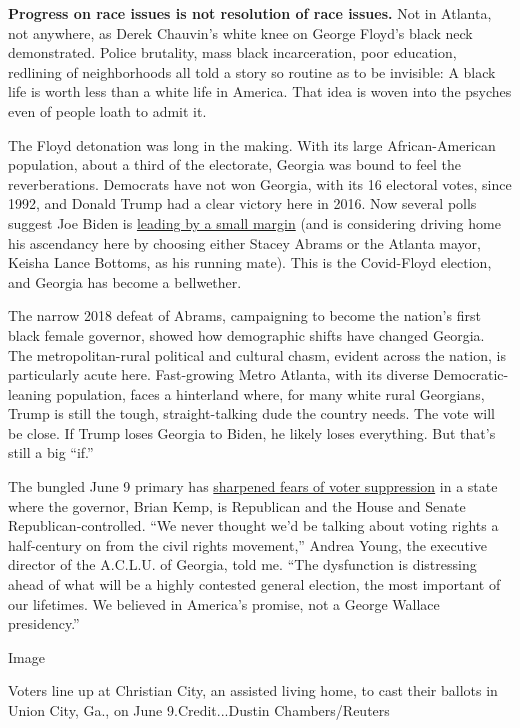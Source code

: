 \textbf{Progress on race issues is not resolution of race issues.} Not
in Atlanta, not anywhere, as Derek Chauvin's white knee on George
Floyd's black neck demonstrated. Police brutality, mass black
incarceration, poor education, redlining of neighborhoods all told a
story so routine as to be invisible: A black life is worth less than a
white life in America. That idea is woven into the psyches even of
people loath to admit it.

The Floyd detonation was long in the making. With its large
African-American population, about a third of the electorate, Georgia
was bound to feel the reverberations. Democrats have not won Georgia,
with its 16 electoral votes, since 1992, and Donald Trump had a clear
victory here in 2016. Now several polls suggest Joe Biden is
\href{https://projects.fivethirtyeight.com/polls/president-general/georgia/}{leading
by a small margin} (and is considering driving home his ascendancy here
by choosing either Stacey Abrams or the Atlanta mayor, Keisha Lance
Bottoms, as his running mate). This is the Covid-Floyd election, and
Georgia has become a bellwether.

The narrow 2018 defeat of Abrams, campaigning to become the nation's
first black female governor, showed how demographic shifts have changed
Georgia. The metropolitan-rural political and cultural chasm, evident
across the nation, is particularly acute here. Fast-growing Metro
Atlanta, with its diverse Democratic-leaning population, faces a
hinterland where, for many white rural Georgians, Trump is still the
tough, straight-talking dude the country needs. The vote will be close.
If Trump loses Georgia to Biden, he likely loses everything. But that's
still a big ``if.''

The bungled June 9 primary has
\href{https://www.nytimes3xbfgragh.onion/2020/06/09/us/politics/atlanta-voting-georgia-primary.html}{sharpened
fears of voter suppression} in a state where the governor, Brian Kemp,
is Republican and the House and Senate Republican-controlled. ``We never
thought we'd be talking about voting rights a half-century on from the
civil rights movement,'' Andrea Young, the executive director of the
A.C.L.U. of Georgia, told me. ``The dysfunction is distressing ahead of
what will be a highly contested general election, the most important of
our lifetimes. We believed in America's promise, not a George Wallace
presidency.''

Image

Voters line up at Christian City, an assisted living home, to cast their
ballots in Union City, Ga., on June 9.Credit...Dustin Chambers/Reuters


